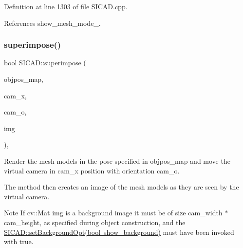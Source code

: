 Definition at line 1303 of file S\+I\+C\+A\+D.\+cpp.



References show\+\_\+mesh\+\_\+mode\+\_\+.

\mbox{\label{classSICAD_a356e0ac8a0f130952a72326bedd4ab60}} 
\subsubsection{\texorpdfstring{superimpose()}{superimpose()}\hspace{0.1cm}{\footnotesize\ttfamily [1/8]}}
{\footnotesize\ttfamily bool S\+I\+C\+A\+D\+::superimpose (\begin{DoxyParamCaption}\item[{const \mbox{\hyperlink{classSuperimpose_a178e3d4e2def6635bfcf9454dd4b5d22}{Model\+Pose\+Container}} \&}]{objpos\+\_\+map,  }\item[{const double $\ast$}]{cam\+\_\+x,  }\item[{const double $\ast$}]{cam\+\_\+o,  }\item[{cv\+::\+Mat \&}]{img }\end{DoxyParamCaption})\hspace{0.3cm}{\ttfamily [override]}, {\ttfamily [virtual]}}



Render the mesh models in the pose specified in {\ttfamily objpos\+\_\+map} and move the virtual camera in {\ttfamily cam\+\_\+x} position with orientation {\ttfamily cam\+\_\+o}. 

The method then creates an image of the mesh models as they are seen by the virtual camera.

\begin{DoxyNote}{Note}
If cv\+::\+Mat {\ttfamily img} is a background image it must be of size {\ttfamily cam\+\_\+width $\ast$ cam\+\_\+height}, as specified during object construction, and the {\ttfamily \mbox{\hyperlink{classSICAD_a07921943ad3d4016dcbe76135e799754}{S\+I\+C\+A\+D\+::set\+Background\+Opt(bool show\+\_\+background)}}} must have been invoked with {\ttfamily true}.
\end{DoxyNote}

